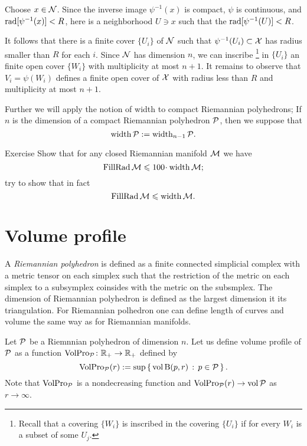 Choose $x\in \mathcal{N}$.
Since the inverse image $\psi^{-1}(x)$ is compact, $\psi$ is continuous, and $\mathop{\rm rad}\nolimits[\psi^{-1}(x)]<R$,
here is a neighborhood $U\ni x$ such that the  $\mathop{\rm rad}\nolimits[\psi^{-1}(U)]<R$.

It follows that there is a finite cover $\{U_i\}$ of $\mathcal{N}$ such that $\psi^{-1}(U_i)\subset\mathcal{X}$ has radius smaller than $R$ for each $i$.
Since $\mathcal{N}$ has dimension $n$, we can inscribe%
\footnote{Recall that a covering $\{W_i\}$ is inscribed in the covering $\{U_i\}$ if for every $W_i$ is a subset of some $U_j$.} 
in $\{U_i\}$ an finite open cover $\{W_i\}$ with multiplicity at most $n+1$.
It remains to observe that $V_i=\psi(W_i)$ defines a finite open cover of $\mathcal{X}$ with radius less than $R$ and multiplicity at most $n+1$. 
\qeds

Further we will apply the notion of width to compact Riemannian polyhedrons;
If $n$ is the dimension of a compact Riemannian polyhedron $\mathcal{P}$, then 
we suppose that
\[\operatorname{\rm width}\nolimits\mathcal{P}\mathrel{:=}\operatorname{\rm width}\nolimits_{n-1}\mathcal{P}.\]

\begin{thm}{Exercise}\label{ex:FillRad<width}
Show that for any closed Riemannian manifold $\mathcal{M}$ we have
\[\FillRad \spc{M}\le 100\cdot \width\spc{M};\]
try to show that in fact
\[\operatorname{\rm FillRad} \mathcal{M}\leqslant \operatorname{\rm width}\nolimits\mathcal{M}.\]

\end{thm}




\section{Volume profile}

A \emph{Riemannian polyhedron} is defined as a finite connected simplicial complex with a metric tensor on each simplex such that the restriction of the metric on each simplex to a subsymplex coinsides with the metric on the subsmplex.
The dimension of Riemannian polyhedron is defined as the largest dimension it its triangulation.
For Riemannian polhedron one can define length of curves and volume the same way as for Riemannian manifolds.

Let $\mathcal{P}$ be a Riemnnian polyhedron of dimension $n$.
Let us define volume profile of $\mathcal{P}$ as a function $\operatorname{\rm VolPro}\nolimits_{\mathcal{P}}\colon\mathbb{R}_+\to\mathbb{R}_+$ defined by 
\[\operatorname{\rm VolPro}\nolimits_{\mathcal{P}}(r)\mathrel{:=} \sup\left\{\,{\operatorname{\rm vol}\nolimits \mathrm{B}{}(p,r)}\,:\,{p\in\mathcal{P}}\,\right\}.\]
Note that $\operatorname{\rm VolPro}\nolimits_{\mathcal{P}}$ is a nondecreasing function and $\VolPro_{\spc{P}}(r)\z\to\vol\spc{P}$ as $r\to\infty$.

